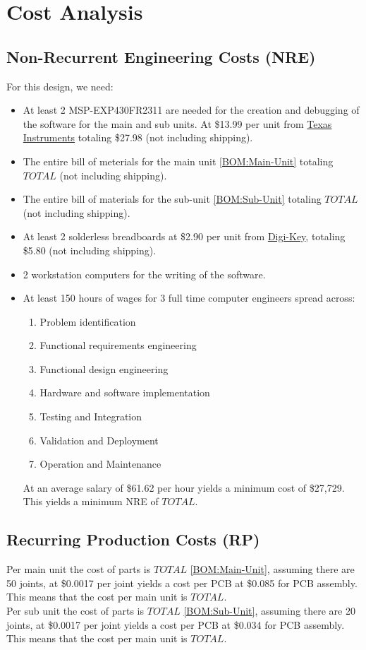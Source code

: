 \section{Cost Analysis}
\subsection{Non-Recurrent Engineering Costs (NRE)}
For this design, we need:

\begin{itemize}
  \item At least 2 MSP-EXP430FR2311 are needed for the creation and debugging of the software for the main and sub units. At \$13.99 per unit from \href{https://www.ti.com/tool/MSP-EXP430FR2311#order-start-development}{Texas Instruments} totaling \$27.98 (not including shipping).
  \item The entire bill of meterials for the main unit \ref{BOM:Main-Unit} totaling $TOTAL$ (not including shipping).
  \item The entire bill of materials for the sub-unit \ref{BOM:Sub-Unit} totaling $TOTAL$ (not including shipping).
  \item At least 2 solderless breadboards at \$2.90 per unit from \href{https://www.digikey.com/en/products/detail/dfrobot/FIT0096/7597069}{Digi-Key}, totaling \$5.80 (not including shipping).
  \item 2 workstation computers for the writing of the software.
  \item At least 150 hours of wages for 3 full time computer engineers spread across:
        \begin{enumerate}
          \item Problem identification
          \item Functional requirements engineering
          \item Functional design engineering
          \item Hardware and software implementation
          \item Testing and Integration
          \item Validation and Deployment
          \item Operation and Maintenance
        \end{enumerate}
At an average salary of \$61.62 per hour \cite{ComputerHardwareEngineers} yields a minimum cost of \$27,729.
This yields a minimum NRE of $TOTAL$.
\end{itemize}
\subsection{Recurring Production Costs (RP)}
Per main unit the cost of parts is $TOTAL$ \ref{BOM:Main-Unit}, assuming there are 50 joints, at \$0.0017 per joint yields a cost per PCB at \$0.085 for PCB assembly. This means that the cost per main unit is $TOTAL$.\\
Per sub unit the cost of parts is $TOTAL$ \ref{BOM:Sub-Unit}, assuming there are 20 joints, at \$0.0017 per joint yields a cost per PCB at \$0.034 for PCB assembly. This means that the cost per main unit is $TOTAL$.\\
